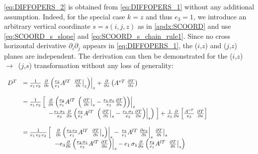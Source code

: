 \documentclass[../main/NEMO_manual]{subfiles}
\begin{document}
\autoref{eq:DIFFOPERS_2} is obtained from \autoref{eq:DIFFOPERS_1} without any additional assumption.
Indeed, for the special case $k=z$ and thus $e_3 =1$,
we introduce an arbitrary vertical coordinate $s = s (i,j,z)$ as in \autoref{apdx:SCOORD} and
use \autoref{eq:SCOORD_s_slope} and \autoref{eq:SCOORD_s_chain_rule1}.
Since no cross horizontal derivative $\partial _i \partial _j $ appears in \autoref{eq:DIFFOPERS_1},
the ($i$,$z$) and ($j$,$z$) planes are independent.
The derivation can then be demonstrated for the ($i$,$z$)~$\to$~($j$,$s$) transformation without
any loss of generality:

\begin{align*}
  {
  \begin{array}{*{20}l}
    D^T&=\frac{1}{e_1\,e_2} \left. {\frac{\partial }{\partial i}\left( {\frac{e_2}{e_1}A^{lT}\;\left. {\frac{\partial T}{\partial i}} \right|_z } \right)} \right|_z
         +\frac{\partial }{\partial z}\left( {A^{vT}\;\frac{\partial T}{\partial z}} \right) \\ \\
       &=\frac{1}{e_1\,e_2 }\left[ {\left. {\;\frac{\partial }{\partial i}\left( {\frac{e_2}{e_1}A^{lT}\;\left( {\left. {\frac{\partial T}{\partial i}} \right|_s
         -\frac{e_1\,\sigma_1 }{e_3 }\frac{\partial T}{\partial s}} \right)} \right)} \right|_s } \right. \\
       & \qquad \qquad \left. { -\frac{e_1\,\sigma_1 }{e_3 }\frac{\partial }{\partial s}\left( {\frac{e_2 }{e_1 }A^{lT}\;\left. {\left( {\left. {\frac{\partial T}{\partial i}} \right|_s -\frac{e_1 \,\sigma_1 }{e_3 }\frac{\partial T}{\partial s}} \right)} \right|_s } \right)\;} \right]
         \shoveright{ +\frac{1}{e_3 }\frac{\partial }{\partial s}\left[ {\frac{A^{vT}}{e_3 }\;\frac{\partial T}{\partial s}} \right]}  \qquad \qquad \qquad \\ \\
       &=\frac{1}{e_1 \,e_2 \,e_3 }\left[ {\left. {\;\;\frac{\partial }{\partial i}\left( {\frac{e_2 \,e_3 }{e_1 }A^{lT}\;\left. {\frac{\partial T}{\partial i}} \right|_s } \right)} \right|_s -\left. {\frac{e_2 }{e_1}A^{lT}\;\frac{\partial e_3 }{\partial i}} \right|_s \left. {\frac{\partial T}{\partial i}} \right|_s } \right. \\
       &  \qquad \qquad \quad \left. {-e_3 \frac{\partial }{\partial i}\left( {\frac{e_2 \,\sigma_1 }{e_3 }A^{lT}\;\frac{\partial T}{\partial s}} \right)} \right|_s -e_1 \,\sigma_1 \frac{\partial }{\partial s}\left( {\frac{e_2 }{e_1 }A^{lT}\;\left. {\frac{\partial T}{\partial i}} \right|_s } \right) \\

\end{array}}
\end{align*}
\end{document}
